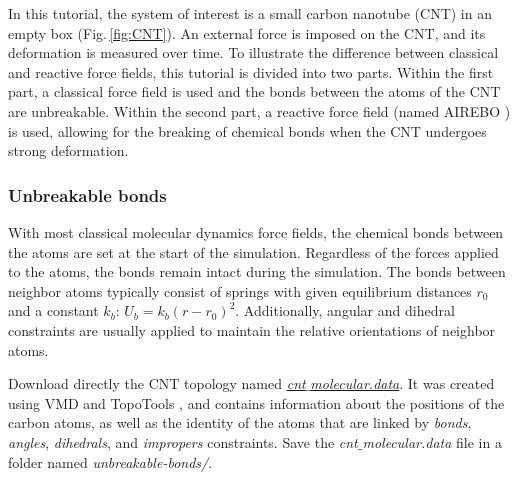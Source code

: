\documentclass[9pt,tutorial]{livecoms}
\begin{document}
\noindent In this tutorial, the system of interest is a small carbon nanotube (CNT) in an empty box (Fig.\,\ref{fig:CNT}). An external force is imposed on the CNT, and its deformation is measured over time. To illustrate the difference between classical and reactive force fields, this tutorial is divided into two parts. Within the first part, a classical force field is used and the bonds between the atoms of the CNT are unbreakable. Within the second part, a reactive force field (named AIREBO \cite{stuart2000reactive}) is used, allowing for the breaking of chemical bonds when the CNT undergoes strong deformation.

\subsubsection{Unbreakable bonds}
\noindent With most classical molecular dynamics force fields, the chemical bonds between the atoms are set at the start of the simulation. Regardless of the forces applied to the atoms, the bonds remain intact during the simulation. The bonds between neighbor atoms typically consist of springs with given equilibrium distances $r_0$ and a constant $k_b$: $U_b = k_b \left( r - r_0 \right)^2$. Additionally, angular and dihedral constraints are usually applied to maintain the relative orientations of neighbor atoms. 

Download directly the CNT topology named \href{https://raw.githubusercontent.com/lammpstutorials/lammpstutorials-article/main/files/tutorial2/cnt_molecular.data}{\textit{cnt$\_$molecular.data}}. It was created using VMD and TopoTools \cite{kohlmeyer2017topotools}, and contains information about the positions of the carbon atoms, as well as the identity of the atoms that are linked by \textit{bonds}, \textit{angles}, \textit{dihedrals}, and \textit{impropers} constraints. Save the \textit{cnt$\_$molecular.data} file
in a folder named \textit{unbreakable-bonds/}.
\end{document}
